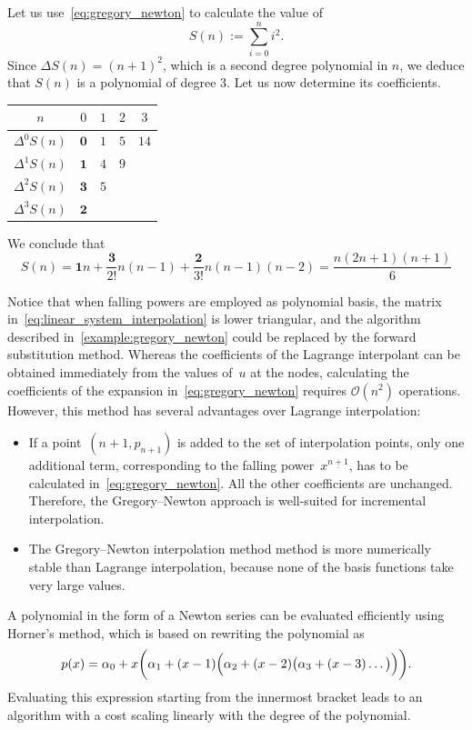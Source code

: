 \begin{example}
    \label{example:gregory_newton}
    Let us use~\eqref{eq:gregory_newton} to calculate the value of
    \[
        S(n) := \sum_{i=0}^{n} i^2.
    \]
    Since $\Delta S(n) = (n+1)^2$,
    which is a second degree polynomial in $n$,
    we deduce that $S(n)$ is a polynomial of degree 3.
    Let us now determine its coefficients.
    \begin{center}
    \begin{tabular}{|c|c|c|c|c|}
        \hline
        $n$    & $0$ & $1$ & $2$ & $3$ \\ \hline
        $\Delta^0 S(n)$ & $\mathbf{0}$ & $1$ & $5$ & $14$ \\ \hline
        $\Delta^1 S(n)$ & $\mathbf{1}$ & $4$ & $9$ &  \\ \hline
        $\Delta^2 S(n)$ & $\mathbf{3}$ & $5$ & & \\ \hline
        $\Delta^3 S(n)$ & $\mathbf{2}$ & & & \\ \hline
    \end{tabular}
    \end{center}
    We conclude that
    \[
        S(n) = \mathbf{1} n + \frac{\mathbf{3}}{2!} n(n-1) + \frac{\mathbf{2}}{3!} n(n-1)(n-2)
        = \frac{n (2n+1) (n+1)}{6}
    \]
\end{example}
Notice that when falling powers are employed as polynomial basis,
the matrix in~\eqref{eq:linear_system_interpolation} is lower triangular,
and the algorithm described in~\cref{example:gregory_newton} could be replaced by the forward substitution method.
Whereas the coefficients of the Lagrange interpolant can be obtained immediately from the values of~$u$ at the nodes,
calculating the coefficients of the expansion in~\eqref{eq:gregory_newton} requires $\mathcal O(n^2)$ operations.
However, this method has several advantages over Lagrange interpolation:
\begin{itemize}
    \item
        If a point~$(n+1, p_{n+1})$ is added to the set of interpolation points,
        only one additional term, corresponding to the falling power~$x^{\underline{n+1}}$,
        has to be calculated in~\eqref{eq:gregory_newton}.
        All the other coefficients are unchanged.
        Therefore, the Gregory--Newton approach is well-suited for incremental interpolation.

    \item
        The Gregory--Newton interpolation method method is more numerically stable than Lagrange interpolation,
        because none of the basis functions take very large values.
\end{itemize}
A polynomial in the form of a Newton series can be evaluated efficiently using Horner's method,
which is based on rewriting the polynomial as
\[
    p(x) = \alpha_0 + x \biggl( \alpha_1 + (x-1)  \Bigl( \alpha_2 + (x-2)\bigl(\alpha_3 + (x-3) \dotsc \bigr) \Bigr)  \biggr).
\]
Evaluating this expression starting from the innermost bracket leads to an algorithm with a cost scaling linearly with the degree of the polynomial.

